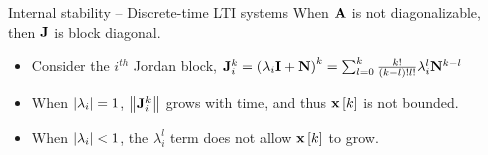 \documentclass[aspectratio=169]{beamer}
\def\mf{\ensuremath\mathbf}
\def\lp{\ensuremath\left(}
\def\rp{\ensuremath\right)}
\def\lv{\ensuremath\left\lvert}
\def\rv{\ensuremath\right\rvert}
\def\lV{\ensuremath\left\lVert}
\def\rV{\ensuremath\right\rVert}
\def\ls{\ensuremath\left[}
\def\rs{\ensuremath\right]}
\newcommand{\ct}[1]{\lp #1\rp}
\newcommand{\dt}[1]{\ls #1\rs}
\begin{document}
\begin{frame}[t]{Internal stability -- Discrete-time LTI systems}
When $\mf{A}$ is not diagonalizable, then $\mf{J}$ is block diagonal.
\begin{itemize}
    \item Consider the $i^{th}$ Jordan block, $\mf{J}_i^k = \ct{\lambda_i \mf{I} + \mf{N}}^k = \sum_{l=0}^k \frac{k!}{(k - l)!l!}\lambda_i^l\mf{N}^{k - l}$

    \item When $\lv \lambda_i\rv = 1$, $\lV \mf{J}_i^k \rV$ grows with time, and thus $\mf{x}\dt{k}$ is not bounded.

    \item When $\lv \lambda_i\rv < 1$, the $\lambda_i^l$ term does not allow $\mf{x}\dt{k}$ to grow.
\end{itemize}
\end{frame}





\end{document}
